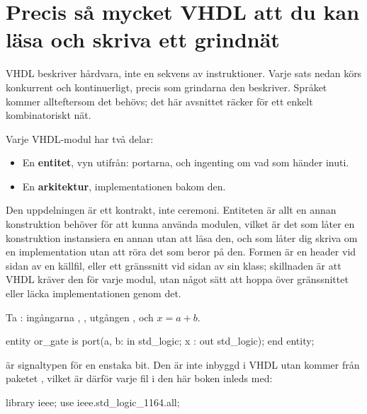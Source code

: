 \section{Precis så mycket VHDL att du kan läsa och skriva ett grindnät}
\label{c1:sec:vhdl}

VHDL beskriver hårdvara, inte en sekvens av instruktioner. Varje sats nedan körs konkurrent och
kontinuerligt, precis som grindarna den beskriver. Språket kommer allteftersom det behövs; det här
avsnittet räcker för ett enkelt kombinatoriskt nät.

Varje VHDL-modul har två delar:
\begin{itemize}
  \item En \textbf{entitet}, vyn utifrån: portarna, och ingenting om vad som händer inuti.
  \item En \textbf{arkitektur}, implementationen bakom den.
\end{itemize}

Den uppdelningen är ett kontrakt, inte ceremoni. Entiteten är allt en annan konstruktion behöver
för att kunna använda modulen, vilket är det som låter en konstruktion instansiera en annan utan
att läsa den, och som låter dig skriva om en implementation utan att röra det som beror på den.
Formen är en header vid sidan av en källfil, eller ett gränssnitt vid sidan av sin klass;
skillnaden är att VHDL kräver den för varje modul, utan något sätt att hoppa över gränssnittet
eller läcka implementationen genom det.

Ta : ingångarna , , utgången , och $x = a + b$.

\begin{vhdlcode}
entity or_gate is
    port(a, b: in std_logic;
         x   : out std_logic);
end entity;
\end{vhdlcode}


 är signaltypen för en enstaka bit. Den är inte inbyggd i VHDL utan kommer från
paketet , vilket är därför varje fil i den här boken inleds med:

\begin{vhdlcode}
library ieee;
use ieee.std_logic_1164.all;
\end{vhdlcode}

